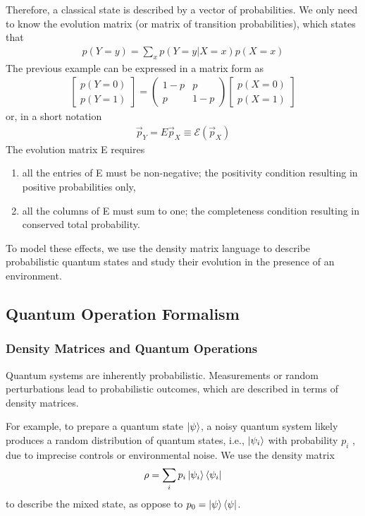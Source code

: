 Therefore, a classical state is described by a vector of probabilities. We only need to know the evolution matrix (or matrix of transition probabilities), which states that
\begin{align*}
    p(Y=y)=\sum_x p(Y=y|X=x)p(X=x)
\end{align*}
The previous example can be expressed in a matrix form as
\begin{align*}
    \begin{bmatrix}
        p(Y=0)\\p(Y=1)
    \end{bmatrix}=\begin{pmatrix}
        1-p & p \\ p & 1-p
    \end{pmatrix}\begin{bmatrix}
        p(X=0)\\p(X=1)
    \end{bmatrix}
\end{align*}
or, in a short notation
\begin{align*}
    \vec{p}_Y=E\vec{p}_X\equiv\mathcal{E}(\vec{p}_X)
\end{align*}
The evolution matrix E requires
\begin{enumerate}\small
    \item all the entries of E must be non-negative; the positivity condition resulting in positive probabilities only,
    \item all the columns of E must sum to one; the completeness condition resulting in conserved total probability.    
\end{enumerate}

To model these effects, we use the density matrix language to describe probabilistic quantum states and study their evolution in the presence of an environment.

\subsection{Quantum Operation Formalism}
\subsubsection{Density Matrices and Quantum Operations}
Quantum systems are inherently probabilistic. Measurements or random perturbations lead to probabilistic outcomes, which are described in terms of density matrices. 

For example, to prepare a quantum state $\ket{\psi}$, a noisy quantum system likely produces a random distribution of quantum states, i.e., $\ket{\psi_i}$ with probability $p_i$ , due to imprecise controls or environmental noise. We use the density matrix
\begin{align*}
    \rho=\sum_i p_i \ket{\psi_i}\bra{\psi_i}
\end{align*}
to describe the mixed state, as oppose to $p_0=\ket{\psi}\bra{\psi}$. 

